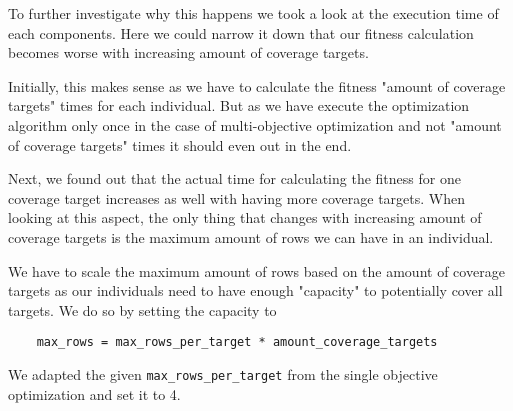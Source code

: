 To further investigate why this happens we took a look at the execution time of each components. Here we could narrow it down that our fitness calculation becomes worse with increasing amount of coverage targets.

Initially, this makes sense as we have to calculate the fitness "amount of coverage targets" times for each individual. But as we have execute the optimization algorithm only once in the case of multi-objective optimization and not "amount of coverage targets" times it should even out in the end.

Next, we found out that the actual time for calculating the fitness for one coverage target increases as well with having more coverage targets. When looking at this aspect, the only thing that changes with increasing amount of coverage targets is the maximum amount of rows we can have in an individual.

We have to scale the maximum amount of rows based on the amount of coverage targets as our individuals need to have enough "capacity" to potentially cover all targets. We do so by setting the capacity to
\begin{verbatim}
	max_rows = max_rows_per_target * amount_coverage_targets
\end{verbatim}
We adapted the given \verb|max_rows_per_target| from the single objective optimization and set it to 4.

